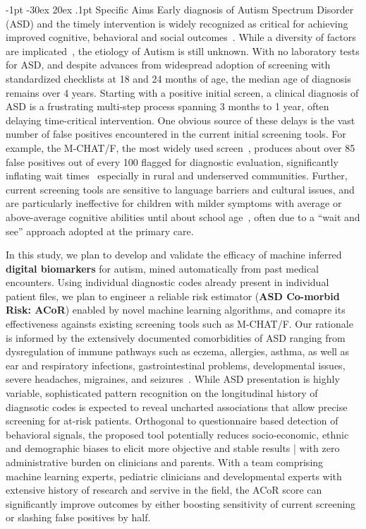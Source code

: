 \documentclass[onecolumn, compsoc,11pt]{IEEEtran}
\makeatletter
\renewcommand\section{\@startsection {section}{1}{\z@}%
                                   {-1pt \@plus -30ex \@minus 20ex}%
                                   {.1pt}%
                                   {\large\bfseries\scshape}}
\def\ZERO{ACoR\xspace}
\makeatother
\begin{document}
\section{Specific Aims}
Early diagnosis of Autism Spectrum Disorder (ASD) and the timely  intervention is widely recognized as critical for achieving improved cognitive, behavioral and social outcomes~\cite{hyman2020identification}.
While a diversity of factors are implicated~\cite{kalb2012determinants,bisgaier2011access,fenikile2015barriers,pmid27565363}, the etiology of Autism is still unknown. With no laboratory tests for ASD, and despite advances from widespread adoption of screening with standardized checklists at 18 and 24 months of age, the median age of diagnosis remains over 4 years.  Starting with a positive initial screen, a clinical diagnosis of ASD is  a  frustrating multi-step process spanning 3 months to 1 year, often delaying  time-critical intervention. One obvious source of these delays  is the vast number of false positives encountered in the current initial  screening tools. For example, the  M-CHAT/F, the most widely used  screen~\cite{robins2014validation,hyman2020identification},  produces about   over 85 false positives out of every 100   flagged for  diagnostic evaluation, significantly inflating wait times~\cite{pmid27565363} especially in rural and underserved communities.
Further, current  screening tools are sensitive to language barriers and cultural issues, and are  particularly ineffective for children with milder symptoms  with average or above-average cognitive abilities until about school age~\cite{jashar2016cognitive,hyman2020identification}, often due to a ``wait and see'' approach adopted at the primary care.


In this study, we plan to develop and validate the efficacy of machine inferred \textbf{digital biomarkers} for autism, mined automatically from past medical encounters. Using individual diagnostic codes already present in individual patient files, we plan to engineer a reliable risk estimator ({\bf ASD Co-morbid Risk: \ZERO}) enabled by novel  machine learning algorithms, and comapre its effectiveness againsts existing screening tools such as M-CHAT/F. Our rationale is informed by the extensively documented comorbidities of ASD ranging from dysregulation of immune pathways such as eczema, allergies, asthma, as well as ear and respiratory infections, gastrointestinal problems, developmental issues, severe headaches, migraines, and seizures~\cite{pmid30733689,pmid22511918}. While ASD presentation is highly variable, sophisticated pattern recognition on the longitudinal history of  diagnsotic codes is expected to reveal uncharted associations that allow precise screening for at-risk patients.
Orthogonal to  questionnaire based  detection of behavioral signals, the proposed tool potentially reduces socio-economic, ethnic and demographic biases to elicit more  objective and stable results |  with zero  administrative burden on clinicians and parents. With a team comprising machine learning experts, pediatric clinicians and developmental experts with extensive history of research and servive in the field,
the \ZERO score can significantly improve outcomes by either boosting sensitivity of current screening or slashing false positives by half.
\end{document}
